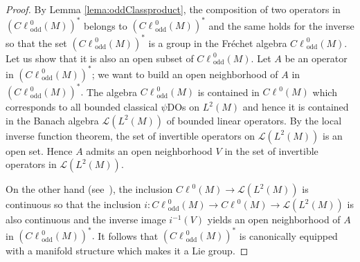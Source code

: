 \documentclass[pdftex]{sigma}
\DeclareMathOperator{\odd}{odd} \DeclareMathOperator{\supp}{supp}
\def \Cl {{C\ell}}
\begin{document}
\begin{proof}
By Lemma \ref{lema:oddClassproduct}, the composition of two operators in $\left(\Cl^{0}_{\odd}(M)\right)^*$ belongs to $\left(\Cl^{0}_{\odd}(M)\right)^*$ and the same holds for the inverse so that the set $\left(\Cl^{0}_{\odd}(M)\right)^*$ is a group in the Fr\'echet algebra $\Cl^{0}_{\odd}(M).$ Let us show that it is also an open subset of $\Cl^{0}_{\odd}(M)$. Let $A$ be an operator in $\left(\Cl^{0}_{\odd}(M)\right)^*$; we want to build an open neighborhood of $A$ in $\left(\Cl^{0}_{\odd}(M)\right)^*.$ The algebra $\Cl^{0}_{\odd}(M)$ is contained in $\Cl^{0}(M)$ which corresponds to all bounded classical $\psi$DOs on $L^2(M)$ and hence it is contained in the Banach algebra ${\mathcal{L}}(L^2(M))$ of bounded linear operators. By the local inverse function theorem, the set of invertible operators on ${\mathcal{L}}(L^2(M))$ is an open set. Hence $A$ admits an open neighborhood $V$ in the set of invertible operators in ${\mathcal{L}}(L^2(M))$.

 On the other hand (see~\cite{Shubin}), the inclusion $\Cl^{0}(M)\to {\mathcal{L}}(L^2(M))$ is continuous so that the inclusion $i:\Cl^{0}_{\odd}(M)\to\Cl^{0}(M)\to {\mathcal{L}}(L^2(M))$ is also continuous and the inverse image $i^{-1}(V)$ yields an open neighborhood of $A$ in $\left(\Cl^{0}_{\odd}(M)\right)^*.$ It follows that $\left(\Cl^{0}_{\odd}(M)\right)^*$ is canonically equipped with a manifold structure which makes it a Lie group.


\end{proof}
\end{document}
